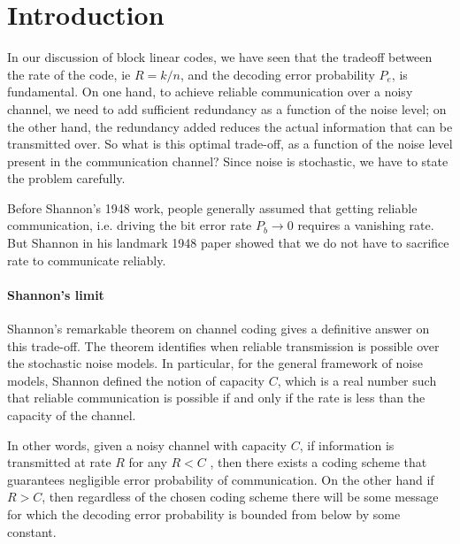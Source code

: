 
\Contributor{}

\lstset{style=mystyle}

\MakeScribeTop


\section{Introduction}
In our discussion of block linear codes, we have seen that the tradeoff between the rate of the code, ie \(R= k/n\), and the decoding error probability \(P_e\), is fundamental. On one hand, to achieve reliable communication over a noisy channel, we need to add sufficient redundancy as a function of the noise level; on the other hand, the redundancy added reduces the actual information that can be transmitted over. So what is this optimal trade-off, as a function of the noise level present in the communication channel? Since noise is stochastic, we have to state the problem carefully. 

Before Shannon’s 1948 work, people generally assumed that getting reliable communication, i.e. driving the bit error rate \(P_b \rightarrow 0\) requires a vanishing rate. But Shannon in his landmark 1948 paper showed that we do not have to sacrifice rate to communicate reliably. 

\paragraph{Shannon's limit} Shannon’s remarkable theorem on channel coding gives a definitive answer on this trade-off. The theorem identifies when reliable transmission is possible over the stochastic noise models. In particular, for the general framework of noise models, Shannon defined the notion of capacity \(C\), which is a real number such that reliable communication is possible if and only if the rate is less than the capacity of the channel. 

In other words, given a noisy channel with capacity \(C\), if information is transmitted at rate \(R\) for any \(R < C\) , then there exists a coding scheme that guarantees negligible error probability of communication. On the other hand if \(R > C\), then regardless of the chosen coding scheme there will be some message for which the decoding error probability is bounded from below by some constant. 

